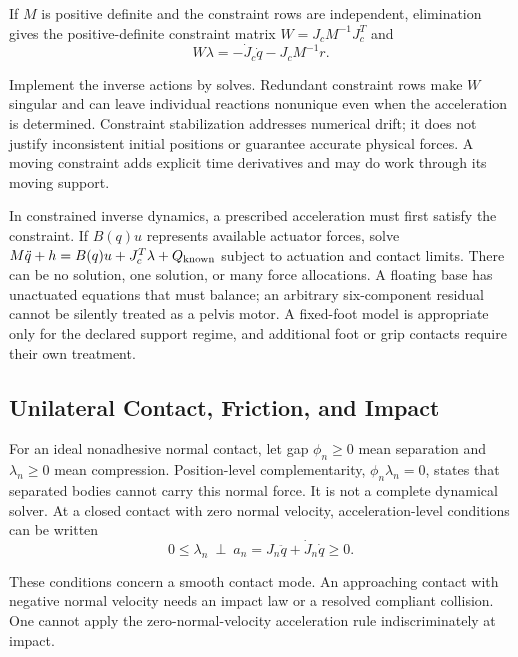 If $M$ is positive definite and the constraint rows are independent, elimination gives the positive-definite constraint matrix $W=J_cM^{-1}J_c^T$ and
\begin{equation}
 W\lambda=-\dot J_c\dot q-J_cM^{-1}r.
 \label{eq:rnea_contact_schur}
\end{equation}

Implement the inverse actions by solves. Redundant constraint rows make $W$ singular and can leave individual reactions nonunique even when the acceleration is determined. Constraint stabilization addresses numerical drift; it does not justify inconsistent initial positions or guarantee accurate physical forces. A moving constraint adds explicit time derivatives and may do work through its moving support.

In constrained inverse dynamics, a prescribed acceleration must first satisfy the constraint. If $B(q)u$ represents available actuator forces, solve $M\ddot q+h=B(q)u+J_c^T\lambda+Q_{\rm known}$ subject to actuation and contact limits. There can be no solution, one solution, or many force allocations. A floating base has unactuated equations that must balance; an arbitrary six-component residual cannot be silently treated as a pelvis motor. A fixed-foot model is appropriate only for the declared support regime, and additional foot or grip contacts require their own treatment.

\subsection{Unilateral Contact, Friction, and Impact}
\label{sec:unilateral_constraints}

For an ideal nonadhesive normal contact, let gap $\phi_n\geq0$ mean separation and $\lambda_n\geq0$ mean compression. Position-level complementarity, $\phi_n\lambda_n=0$, states that separated bodies cannot carry this normal force. It is not a complete dynamical solver. At a closed contact with zero normal velocity, acceleration-level conditions can be written
\begin{equation}
 0\leq\lambda_n\ \perp\ a_n=J_n\ddot q+\dot J_n\dot q\geq0.
 \label{eq:rnea_normal_complementarity}
\end{equation}

These conditions concern a smooth contact mode. An approaching contact with negative normal velocity needs an impact law or a resolved compliant collision. One cannot apply the zero-normal-velocity acceleration rule indiscriminately at impact.

